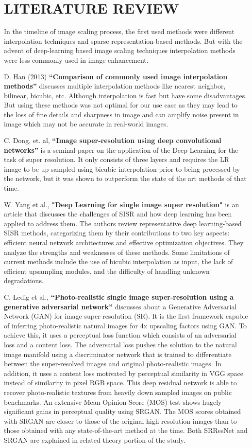 \newpage
\section{LITERATURE REVIEW}
In the timeline of image scaling process, the first used methods were different interpolation techniques and sparse representation-based methods. But with the advent
of deep-learning based image scaling techniques interpolation methods were less commonly used in image enhancement.

D. Han (2013) {\bf“Comparison of commonly used image interpolation methods”} discusses multiple interpolation methods like nearest neighbor, bilinear, bicubic, etc. Although interpolation is fast but have some disadvantages. But using these methods was not optimal for our use case as they may lead to the loss of fine details and sharpness in image and can amplify noise present in image which may not be accurate in real-world images.\cite{r1}

C. Dong, et. al, {\bf“Image super-resolution using deep convolutional networks”} is a seminal paper on the application of the Deep Learning for the task of super resolution. It only consists of three layers and requires the LR image to be up-sampled using bicubic interpolation prior to being processed by the network, but it was shown to outperform the state of the art methods of that time.\cite{r2}

W. Yang et al., {\bf "Deep Learning for single image super resolution"} is an article that discusses the challenges of SISR and how deep learning has been applied to address them. The authors review representative deep learning-based SISR methods, categorizing them by their contributions to two key aspects: efficient neural network architectures and effective optimization objectives. They analyze the strengths and weaknesses of these methods. Some limitations of current methods include the use of bicubic interpolation as input, the lack of efficient upsampling modules, and the difficulty of handling unknown degradations. \cite{r4}

C. Ledig et al., {\bf“Photo-realistic single image super-resolution using a generative adversarial network”} discusses about a Generative Adversarial Network (GAN) for image super-resolution (SR). It is the first framework capable of inferring photo-realistic natural images for 4x upscaling factors using GAN. To achieve this, it uses
a perceptual loss function which consists of an adversarial loss and a content loss. The adversarial loss pushes the solution to the natural image manifold using a discriminator
network that is trained to differentiate between the super-resolved images and original photo-realistic images. In addition, it uses a content loss motivated by perceptual
similarity in VGG space instead of similarity in pixel RGB space. This deep residual network is able to recover photo-realistic textures from heavily down sampled images on public
benchmarks. An extensive Mean-Opinion-Score (MOS) test shows hugely significant gains in perceptual quality using SRGAN. The MOS scores obtained with SRGAN are
closer to those of the original high-resolution images than to those obtained with any state-of-the-art method at the time. Both SRResNet and SRGAN are explained in related theory portion of the study.\cite{r3}
